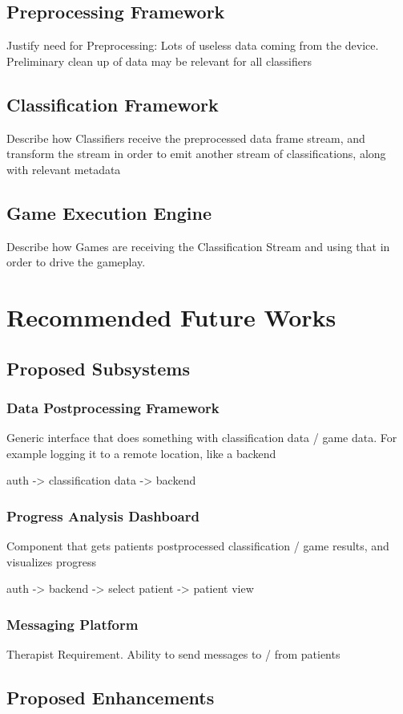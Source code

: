 \documentclass[master,english]{hgbthesis}
\begin{document}
\section{Preprocessing Framework}
Justify need for Preprocessing: Lots of useless data coming from the device. Preliminary
clean up of data may be relevant for all classifiers
\section{Classification Framework}
Describe how Classifiers receive the preprocessed data frame stream, and transform the stream in order to emit another stream of classifications, along with relevant metadata
\section{Game Execution Engine}
Describe how Games are receiving the Classification Stream and using that in order to drive the gameplay.
\chapter{Recommended Future Works}
\section{Proposed Subsystems}
\subsection{Data Postprocessing Framework}
Generic interface that does something with classification data / game data. For example logging it to a remote location, like a backend

auth -> classification data -> backend
\subsection{Progress Analysis Dashboard}
Component that gets patients postprocessed classification / game results, and visualizes progress

auth -> backend -> select patient -> patient view
\subsection{Messaging Platform}
Therapist Requirement. Ability to send messages to / from patients
\section{Proposed Enhancements}
\end{document}
